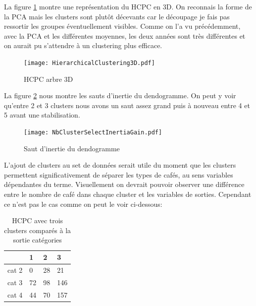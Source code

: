\noindent La figure \ref{HCT_3d} montre une représentation du HCPC en 3D. On reconnais la forme de la PCA mais les clusters sont plutôt décevants car le découpage je fais pas ressortir les groupes éventuellement visibles. Comme on l'a vu précédemment, avec la PCA et les différentes moyennes, les deux années sont très différentes et on aurait pu s'attendre à un clustering plus efficace. 

\begin{figure}[H]
	\texttt{[image: HierarchicalClustering3D.pdf]}
	\caption{\label{HCT_3d} HCPC arbre 3D}
\end{figure}


\noindent La figure \ref{HCT_Inert} nous montre les sauts d'inertie du dendogramme. On peut y voir qu'entre 2 et 3 clusters nous avons un saut assez grand puis à nouveau entre 4 et 5 avant une stabilisation. 



\begin{figure}[H]
	\texttt{[image: NbClusterSelectInertiaGain.pdf]}
	\caption{\label{HCT_Inert} Saut d'inertie du dendogramme  }
\end{figure}






\noindent L'ajout de clusters au set de données serait utile du moment que les clusters permettent significativement de séparer les types de cafés, au sens variables dépendantes du terme. Visuellement on devrait pouvoir observer une différence entre le nombre de café dans chaque cluster et les variables de sorties. Cependant ce n'est pas le cas comme on peut le voir ci-dessous: 


\begin{table}[H]
	\centering
	\label{cluster3category}
	\begin{tabular}{llll}
		 & 1  & 2  & 3   \\
		 \hline
		cat 2            & 0  & 28 & 21  \\
		cat 3            & 72 & 98 & 146 \\
		cat 4            & 44 & 70 & 157 
	\end{tabular}
	\caption{HCPC avec trois clusters comparés à la sortie catégories}
\end{table}


